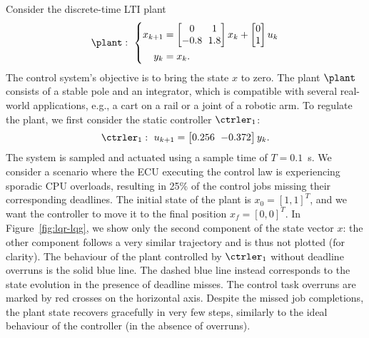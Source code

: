 \begin{example}
    Consider the discrete-time LTI plant
     \begin{equation}
        \label{eq:example-plant}
        {\setlength\arraycolsep{3pt}
            \plant: \,\, \left\{
            \begin{aligned}
                x_{k+1} &= 
                \begin{bmatrix}
                    0 & 1 \\
                    -0.8 & 1.8
                \end{bmatrix} x_k + 
                \begin{bmatrix}
                    0 \\
                    1
                \end{bmatrix} u_k \\
                y_k &= x_k.
                 \end{aligned}
            \right.
        }
    \end{equation}   
    The control system's objective is to bring the state $x$ to zero.
    The plant $\plant$ consists of a stable pole and an integrator, which is compatible with several real-world applications, e.g., a cart on a rail or a joint of a robotic arm.
    To regulate the plant, we first consider the static controller $\ctrler_1$:
    \begin{equation*}
        {\setlength\arraycolsep{3pt}
        \begin{aligned}
            \ctrler_1: \,\, 
            u_{k+1} = 
            \begin{bmatrix}
                0.256 & -0.372
            \end{bmatrix} y_k.
        \end{aligned}
        }
    \end{equation*}
    The system is sampled and actuated using a sample time of $T = 0.1$~s.
    We consider a scenario where the ECU executing the control law is experiencing sporadic CPU overloads, resulting in 25\% of the control jobs missing their corresponding deadlines.
    The initial state of the plant is $x_0 = [1, 1]^T$, and we want the controller to move it to the final position $x_\mathit{f} = [0, 0]^T$.
    In Figure~\ref{fig:lqr-lqg}, we show only the second component of the state vector $x$: the other component follows a very similar trajectory and is thus not plotted (for clarity).
    The behaviour of the plant controlled by $\ctrler_1$ without deadline overruns is the solid blue line.
    The dashed blue line instead corresponds to the state evolution in the presence of deadline misses.
    The control task overruns are marked by red crosses on the horizontal axis.
    Despite the missed job completions, the plant state recovers gracefully in very few steps, similarly to the ideal behaviour of the controller (in the absence of overruns).
    

\end{example}
